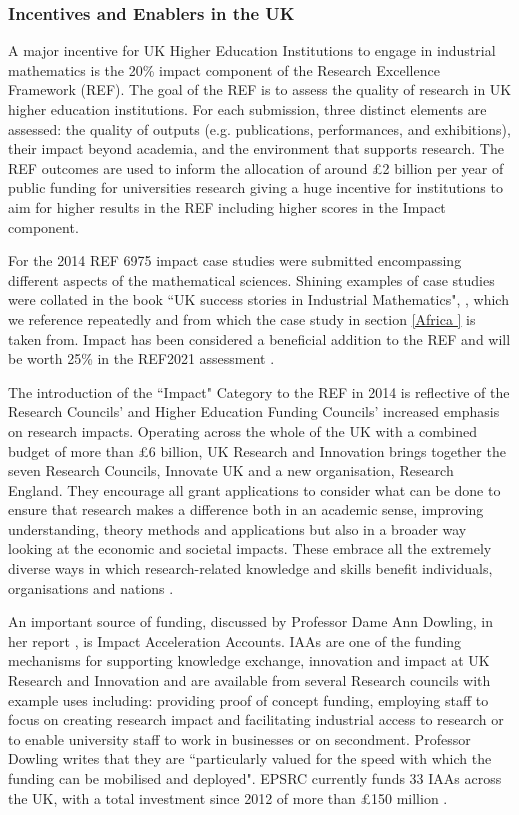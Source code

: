 \documentclass[11pt]{article} %
\begin{document}
\subsubsection{Incentives and Enablers in the UK} 
A major incentive for UK Higher Education Institutions to engage in industrial mathematics is the 20\% impact component of the Research Excellence Framework (REF). The goal of the REF is to assess the quality of research in UK higher education institutions. For each submission, three distinct elements are assessed: the quality of outputs (e.g. publications, performances, and exhibitions), their impact beyond academia, and the environment that supports research. The REF outcomes are used to inform the allocation of around £2 billion per year of public funding for universities research giving a huge  incentive for institutions to aim for higher results in the REF including higher scores in the Impact component.

 For the 2014 REF 6975 impact case studies were submitted encompassing different aspects of the mathematical sciences. Shining examples of case studies were collated in the book ``UK success stories in Industrial Mathematics", \cite{Aston2016},  which we reference repeatedly and from which the case study in section \ref{Africa } is taken from. Impact has been considered a beneficial addition to the REF and will be worth 25\% in the REF2021 assessment \cite{REF2017}.

The introduction of the ``Impact" Category to the REF in 2014 is reflective of the Research Councils' and Higher Education Funding Councils' increased emphasis on research impacts. Operating across the whole of the UK with a combined budget of more than £6 billion, UK Research and Innovation brings together the seven Research Councils, Innovate UK and a new organisation, Research England. They encourage all grant applications to consider  what can be done to ensure that research makes a difference both in an academic sense, improving understanding, theory methods and applications but also in a broader way looking at the economic and societal impacts. These embrace all the extremely diverse ways in which research-related knowledge and skills benefit individuals, organisations and nations \cite{UKRI}. 
 
An important source of funding, discussed by Professor Dame Ann Dowling, in her report \cite{DOWLING2015}, is Impact Acceleration Accounts. IAAs are one of the funding mechanisms for supporting knowledge exchange, innovation and impact at UK Research and Innovation and are available from several Research councils with example uses including: providing proof of concept funding, employing staff to focus on creating research impact and facilitating industrial access to research or to enable university staff to work in businesses or on secondment. Professor Dowling writes that they are ``particularly valued for the speed with which the funding can be mobilised and deployed".  EPSRC currently funds 33 IAAs across the UK, with a total investment since 2012 of more than £150 million \cite{IAA}.
		
\end{document}
